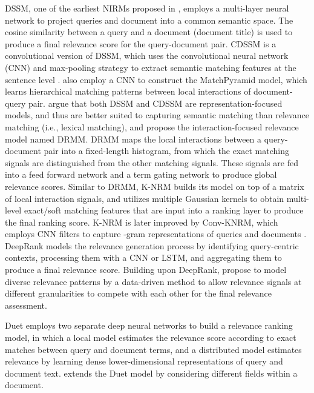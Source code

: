 \documentclass[11pt,a4paper]{article}
\begin{document}
DSSM, one of the earliest NIRMs proposed in \cite{DBLP:conf/cikm/HuangHGDAH13}, employs a multi-layer neural network to project queries and document into a common semantic space. The cosine similarity between a query and a document (document title) is used to produce a final relevance score for the query-document pair. CDSSM is a convolutional version of DSSM, which uses the convolutional neural network (CNN) and max-pooling strategy to extract semantic matching features at the sentence level \cite{DBLP:conf/www/ShenHGDM14}. \cite{DBLP:journals/corr/PangLGXC16} also employ a CNN to construct the MatchPyramid model, which learns hierarchical matching patterns between local interactions of document-query pair. \cite{DBLP:conf/cikm/GuoFAC16} argue that both DSSM and CDSSM are representation-focused models, and thus are better suited to capturing semantic matching than relevance matching (i.e., lexical matching), and propose the interaction-focused relevance model named DRMM. DRMM maps the local interactions between a query-document pair into a fixed-length histogram, from which the exact matching signals are distinguished from the other matching signals. These signals are fed into a feed forward network and a term gating network to produce global relevance scores. Similar to DRMM, K-NRM \cite{DBLP:conf/sigir/XiongDCLP17} builds its model on top of a matrix of local interaction signals, and utilizes multiple Gaussian kernels to obtain multi-level exact/soft matching features that are input into a ranking layer to produce the final ranking score. K-NRM is later improved by Conv-KNRM, which employs CNN filters to capture -gram representations of queries and documents \cite{DBLP:conf/wsdm/DaiXC018}. DeepRank \cite{DBLP:conf/cikm/PangLGXXC17} models the relevance generation process by identifying query-centric contexts, processing them with a CNN or LSTM, and aggregating them to produce a final relevance score. Building upon DeepRank, \cite{DBLP:conf/sigir/FanGLXZC18} propose to model diverse relevance patterns by a data-driven method to allow relevance signals at different granularities to compete with each other for the final relevance assessment.

Duet \cite{DBLP:conf/www/Mitra0C17} employs two separate deep neural networks to build a relevance ranking model, in which a local model estimates the relevance score according to exact matches between query and document terms, and a distributed model estimates relevance by learning dense lower-dimensional representations of query and document text. \cite{DBLP:conf/wsdm/ZamaniMSCT18} extends the Duet model by considering different fields within a document. 
\end{document}
